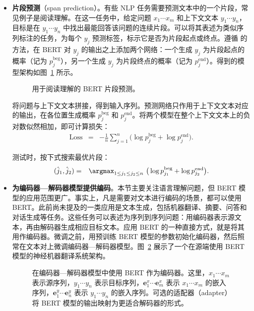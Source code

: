 \begin{itemize}
\item \vspace{0.3em} \textbf{片段预测}（span prediction）。有些 NLP 任务需要预测文本中的一个片段，常见例子是阅读理解。在这一任务中，给定问题 $x_1 \cdots x_m$ 和上下文文本 $y_1 \cdots y_n$，目标是在 $y_1 \cdots y_n$ 中找出最能回答该问题的连续片段。可以将其表述为类似序列标注的任务，为每个 $y_j$ 预测标签，标示它是否为片段起点或终点。遵循 \citet{seo-etal:2017bidirectional} 的方法，在 BERT 对 $y_j$ 的输出之上添加两个网络：一个生成 $y_j$ 为片段起点的概率（记为 $p_j^{\mathrm{beg}}$），另一个生成 $y_j$ 为片段终点的概率（记为 $p_j^{\mathrm{end}}$）。得到的模型架构如图~\ref{fig:bert-app-span-prediction} 所示。

\begin{figure}[!ht]
\centering

\caption{用于阅读理解的 BERT 片段预测。}
\label{fig:bert-app-span-prediction}
\end{figure}

    将问题与上下文文本拼接，得到输入序列。预测网络只作用于上下文文本对应的输出，在各位置生成概率 $p_j^{\mathrm{beg}}$ 和 $p_j^{\mathrm{end}}$。将两个模型在整个上下文文本上的负对数似然相加，即可计算损失：
    \begin{eqnarray}
    \mathrm{Loss} & = & - \frac{1}{n} \sum_{j=1}^{n} \big( \log p_j^{\mathrm{beg}} + \log p_j^{\mathrm{end}} \big).
    \end{eqnarray}

    测试时，按下式搜索最优片段：
    \begin{eqnarray}
    (\hat{j}_1,\hat{j}_2) & = & \argmax_{1 \le j_1 \le j_2 \le n}\ \big( \log p_{j_1}^{\mathrm{beg}} + \log p_{j_2}^{\mathrm{end}} \big).
    \end{eqnarray}

\item \vspace{0.3em} \textbf{为编码器—解码器模型提供编码}。本节主要关注语言理解问题，但 BERT 模型的应用范围更广。事实上，凡是需要对文本进行编码的场景，都可以使用 BERT。此前尚未提及的一类应用是文本生成，包括机器翻译、摘要、问答和对话生成等任务。这些任务可以表述为序列到序列问题：用编码器表示源文本，再由解码器生成相应目标文本。应用 BERT 的一种直接方式，就是将其用作编码器。微调之前，用预训练 BERT 模型的参数初始化编码器，然后照常在文本对上微调编码器—解码器模型。图~\ref{fig:bert-app-encoder-decoder} 展示了一个在源端使用 BERT 模型的神经机器翻译系统架构。

\begin{figure}[!ht]
\centering

\caption{在编码器—解码器模型中使用 BERT 作为编码器。这里，$x_1 \cdots x_m$ 表示源序列，$y_1 \cdots y_n$ 表示目标序列，$\mathbf{e}_{1}^{x} \cdots \mathbf{e}_{m}^{x}$ 表示 $x_1 \cdots x_m$ 的嵌入序列，$\mathbf{e}_{1}^{y} \cdots \mathbf{e}_{n}^{y}$ 表示 $y_1 \cdots y_n$ 的嵌入序列。可选的适配器（adapter）将 BERT 模型的输出映射为更适合解码器的形式。}
\label{fig:bert-app-encoder-decoder}
\end{figure}

\end{itemize}
\vspace{0.5em}

